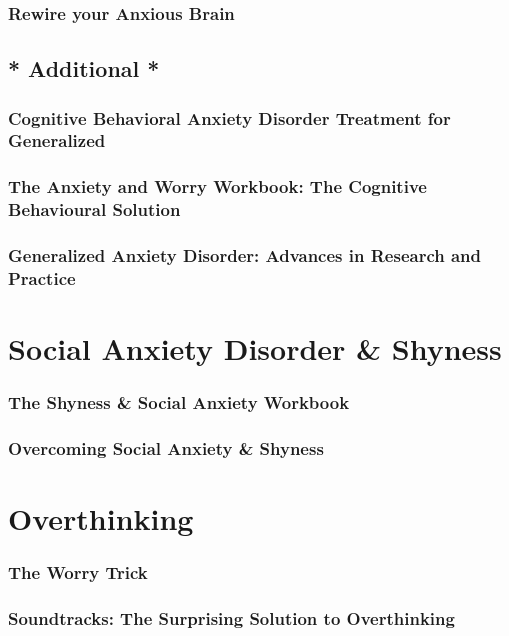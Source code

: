 \documentclass[12pt, a4paper]{article}
\newcommand{\nl}{\vspace{\baselineskip}}
\begin{document}
\subsubsection*{Rewire your Anxious Brain}\nl
\subsection*{* Additional *}
\subsubsection*{Cognitive Behavioral Anxiety Disorder Treatment for Generalized}
\subsubsection*{The Anxiety and Worry Workbook: The Cognitive Behavioural Solution}
\subsubsection*{Generalized Anxiety Disorder: Advances in Research and Practice}\nl

\section*{Social Anxiety Disorder \& Shyness}
\subsubsection*{The Shyness \& Social Anxiety Workbook}
\subsubsection*{Overcoming Social Anxiety \& Shyness}\nl

\newpage

\section*{Overthinking}
\subsubsection*{The Worry Trick}
\subsubsection*{Soundtracks: The Surprising Solution to Overthinking}\nl

\end{document}
